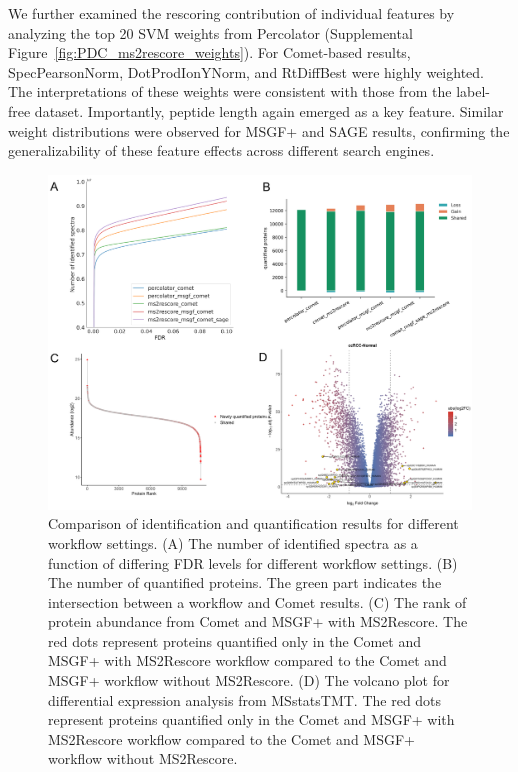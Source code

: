 \documentclass[12pt]{article}
\begin{document}
We further examined the rescoring contribution of individual features by analyzing the top 20 SVM weights from Percolator (Supplemental Figure~\ref{fig:PDC_ms2rescore_weights}). For Comet-based results, SpecPearsonNorm, DotProdIonYNorm, and RtDiffBest were highly weighted. The interpretations of these weights were consistent with those from the label-free dataset. Importantly, peptide length again emerged as a key feature. Similar weight distributions were observed for MSGF+ and SAGE results, confirming the generalizability of these feature effects across different search engines.

\begin{figure}[ht!]
	\centering
	\includegraphics[width=1\textwidth]{figures//CPTAC_TMT.png}
	\caption{Comparison of identification and quantification results for different workflow settings. (A) The number of identified spectra as a function of differing FDR levels for different workflow settings. (B) The number of quantified proteins. The green part indicates the intersection between a workflow and Comet results. (C) The rank of protein abundance from Comet and MSGF+ with MS2Rescore. The red dots represent proteins quantified only in the Comet and MSGF+ with MS2Rescore workflow compared to the Comet and MSGF+ workflow without MS2Rescore. (D) The volcano plot for differential expression analysis from MSstatsTMT. The red dots represent proteins quantified only in the Comet and MSGF+ with MS2Rescore workflow compared to the Comet and MSGF+ workflow without MS2Rescore.}
	\label{fig:PDC_ms2rescore}
\end{figure}
\end{document}

